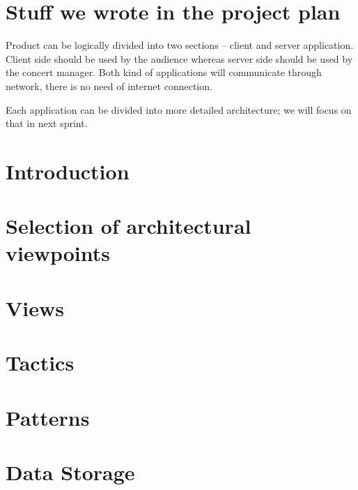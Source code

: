 \section{Stuff we wrote in the project plan}
Product can be logically divided into two sections -- client and server application.
Client side should be used by the audience whereas server side should be used by the concert manager.
Both kind of applications will communicate through network, there is no need of internet connection.

Each application can be divided into more detailed architecture; we will focus on that in next sprint.
\section{Introduction}
\section{Selection of architectural viewpoints}
\section{Views}
\section{Tactics}
\section{Patterns}
\section{Data Storage}

